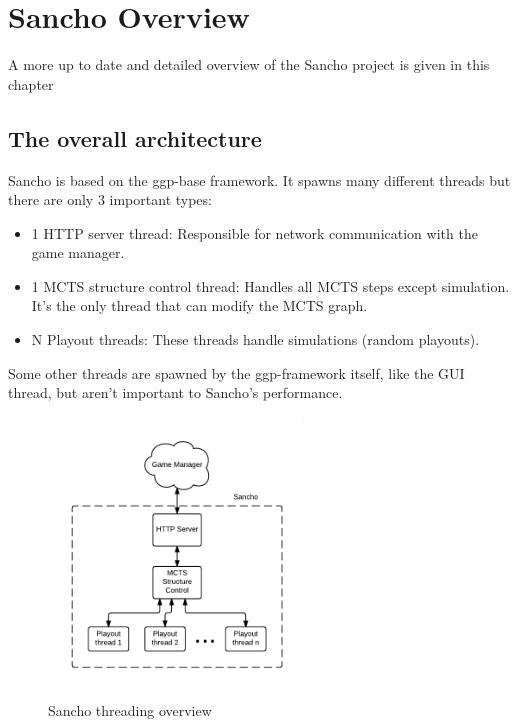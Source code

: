 
\chapter{Sancho Overview}
\label{chapter:sancho_overview}

A more up to date and detailed overview of the Sancho project is given in this chapter

\section{The overall architecture}

Sancho is based on the ggp-base framework.
It spawns many different threads but there are only 3 important types:

\begin{itemize}
	\item 1 HTTP server thread: Responsible for network communication with the game manager.
	\item 1 MCTS structure control thread: Handles all MCTS steps except simulation. It's the only thread that can modify the MCTS graph.
	\item N Playout threads: These threads handle simulations (random playouts).    
\end{itemize}

Some other threads are spawned by the ggp-framework itself, like the GUI thread, but aren't important to Sancho's performance.

\begin{figure}[h]
	\centering
	\includegraphics[width=0.6\textwidth]{images/Sancho_overview.pdf}
	\caption{Sancho threading overview}
	\label{fig:sancho_overview}
\end{figure}


